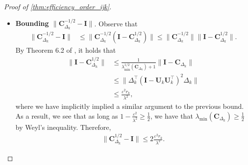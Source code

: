 \documentclass[10pt]{article}
\newcommand{\0}{{\mathbf{0}}}
\newcommand{\1}{{\mathbf{1}}}
\newcommand{\I}{{\mathbf{I}}}
\newcommand{\U}{{\mathbf{U}}}
\renewcommand{\citet}{\cite}
\renewcommand{\t}{^{\top}}
\newcommand{\eps}{\varepsilon}
\begin{document}
\begin{proof}[Proof of \cref{thm:efficiency_order_ijk}]
\begin{itemize}
\begin{itemize}
Since $\mathbf{v}$ is a vector of signs, the matrix $ (\mathbf{I} - \U_k \U_k\t)\begin{pmatrix} \mathbf{v}\t \\ \mathbf{0} \end{pmatrix}$ is simply the rank one matrix whose columns are the entries of the first row of the matrix $(\mathbf{I} - \U_k \U_k\t)$.  Consequently, $\| (\mathbf{I} - \U_k \U_k\t)\begin{pmatrix} \mathbf{v}\t \\ \mathbf{0} \end{pmatrix}\|_{2,\infty} \leq \| (\mathbf{I} - \U_k \U_k\t)\begin{pmatrix} \mathbf{v}\t \\ \mathbf{0} \end{pmatrix}\| \leq \sqrt{r_k}$.  Combining these bounds yields that
\begin{align*}
    \| (\I - \U_k \U_k\t ) \Delta_k \|_{2,\infty} &\leq \frac{\eps \sqrt{r_k}}{\lambda}.
\end{align*}
        \item \textbf{Bounding $\|\mathbf{C}_{\Delta_k}^{-1/2} - \I \|$}. 
        Observe that
        \begin{align*}
            \| \mathbf{C}_{\Delta_k}^{-1/2} - \I \| &\leq \| \mathbf{C}_{\Delta_k}^{-1/2} ( \I - \mathbf{C}_{\Delta_k}^{1/2}) \| \leq \| \mathbf{C}_{\Delta_k}^{-1/2} \| \| \I - \mathbf{C}_{\Delta_k}^{1/2} \|.
        \end{align*}
        By Theorem 6.2 of \citet{higham_functions_2008}, it holds that
        \begin{align*}
            \| \I - \mathbf{C}_{\Delta_k}^{1/2} \| &\leq \frac{1}{\lambda_{\min}^{1/2}(\mathbf{C}_{\Delta_k}) + 1} \| \I - \mathbf{C}_{\Delta_k} \| \\
            &\leq \| \Delta_k\t (\mathbf{I} - \U_k \U_k\t)^2 \Delta_k \| \\
            &\leq \frac{\eps^2 r_k}{\lambda^2},
        \end{align*}
        where we have implicitly implied a similar argument to the previous bound.  As a result, we see that as long as $1 - \frac{\eps^2}{\lambda^2} \geq \frac{1}{2}$, we have that $\lambda_{\min}(\mathbf{C}_{\Delta_k}) \geq \frac{1}{2}$ by Weyl's inequality.  Therefore,
        \begin{align*}
            \| \mathbf{C}_{\Delta_k}^{1/2} - \I \| \leq 2 \frac{\eps^2 r_k}{\lambda^2}.
        \end{align*}
    \end{itemize}

\end{itemize}
\end{proof}
\end{document}
